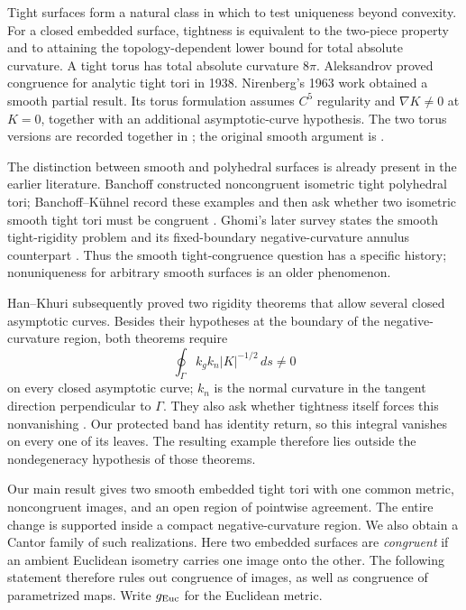 \documentclass[11pt]{amsart}
\theoremstyle{definition}
\theoremstyle{remark}
\numberwithin{equation}{section}
\begin{document}
Tight surfaces form a natural class in which to test uniqueness beyond
convexity. For a closed embedded surface, tightness is equivalent to the
two-piece property and to attaining the topology-dependent lower bound
for total absolute curvature. A tight torus has total absolute curvature
$8\pi$. Aleksandrov proved congruence for analytic tight tori
in 1938. Nirenberg's 1963 work obtained a smooth partial result.
Its torus formulation assumes $C^5$ regularity and $\nabla K\ne0$ at
$K=0$, together with an additional asymptotic-curve hypothesis. The two
torus versions are recorded together in \cite[Theorem~1.6.1]{BK}; the original
smooth argument is \cite{Nirenberg}.

The distinction between smooth and polyhedral surfaces is already
present in the earlier literature. Banchoff constructed noncongruent
isometric tight polyhedral tori; Banchoff--K\"uhnel record these examples
and then ask whether two isometric smooth tight tori must be congruent
\cite[Example~1.6.2 and Question~11]{BK}. Ghomi's later survey states
the smooth tight-rigidity problem and its fixed-boundary
negative-curvature annulus counterpart \cite[Problems~1.2--1.3]{GhomiProblems}.
Thus the smooth tight-congruence question has a specific history;
nonuniqueness for arbitrary smooth surfaces is an older phenomenon.

Han--Khuri subsequently proved two rigidity theorems that allow several
closed asymptotic curves. Besides their hypotheses at the boundary of
the negative-curvature region, both theorems require
\[
 \oint_\Gamma k_gk_n|K|^{-1/2}\,ds\ne0
\]
on every closed asymptotic curve; $k_n$ is the normal curvature in the
tangent direction perpendicular to $\Gamma$. They also ask whether
tightness itself forces this nonvanishing \cite[Theorems~1--2 and the
following remark]{HK}. Our protected band has identity return, so this
integral vanishes on every one of its leaves. The resulting example
therefore lies outside the nondegeneracy hypothesis of those theorems.

Our main result gives two smooth embedded tight tori with one common
metric, noncongruent images, and an open region of pointwise agreement.
The entire change is supported inside a compact negative-curvature
region. We also obtain a Cantor family of such realizations.
Here two embedded surfaces are \emph{congruent} if an ambient Euclidean
isometry carries one image onto the other. The following statement therefore
rules out congruence of images, as well as congruence of parametrized maps.
Write $g_{\rm Euc}$ for the Euclidean metric.
\end{document}
